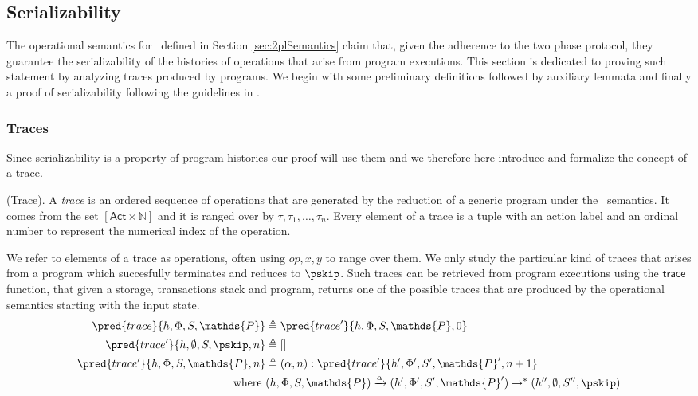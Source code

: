 \subsection{Serializability}

The operational semantics for \tpl\ defined in Section \ref{sec:2plSemantics} claim that, given the adherence to the two phase protocol, they guarantee the serializability of the histories of operations that arise from program executions. This section is dedicated to proving such statement by analyzing traces produced by programs. We begin with some preliminary definitions followed by auxiliary lemmata and finally a proof of serializability following the guidelines in \cite{ccontrol}.

\subsubsection{Traces}

Since serializability is a property of program histories our proof will use them and we therefore here introduce and formalize the concept of a trace.

\begin{defn}
	(Trace).
	A \emph{trace} is an ordered sequence of operations that are generated by the reduction of a generic program under the \tpl\ semantics. It comes from the set $[\mathsf{Act} \times \mathds{N}]$ and it is ranged over by $\tau, \tau_1, \ldots, \tau_n$. Every element of a trace is a tuple with an action label and an ordinal number to represent the numerical index of the operation.
\end{defn}

We refer to elements of a trace as operations, often using $op, x, y$ to range over them. We only study the particular kind of traces that arises from a program which succesfully terminates and reduces to $\pskip$. Such traces can be retrieved from program executions using the $\mathsf{trace}$ function, that given a storage, transactions stack and program, returns one of the possible traces that are produced by the operational semantics starting with the input state.
\begin{align*}
	\pred{trace}{h, \Phi, S, \mathds{P}} &\triangleq \pred{trace'}{h, \Phi, S, \mathds{P}, 0} \\
	\pred{trace'}{h, \emptyset, S, \pskip, n} &\triangleq [] \\
	\pred{trace'}{h, \Phi, S, \mathds{P}, n} &\triangleq (\alpha, n) : \pred{trace'}{h', \Phi', S', \mathds{P}', n+ 1}
	\\
	\text{where }& (h, \Phi, S, \mathds{P}) \xrightarrow{\alpha} (h', \Phi', S', \mathds{P}') \rightarrow^* (h'', \emptyset, S'', \pskip)
\end{align*}


